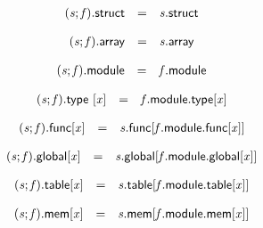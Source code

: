 $$
\begin{array}{@{}lcl@{}l@{}}
({\mathit{s}} ; {\mathit{f}}).\mathsf{struct} &=& {\mathit{s}}.\mathsf{struct} &  \\
\end{array}
$$

$$
\begin{array}{@{}lcl@{}l@{}}
({\mathit{s}} ; {\mathit{f}}).\mathsf{array} &=& {\mathit{s}}.\mathsf{array} &  \\
\end{array}
$$

$$
\begin{array}{@{}lcl@{}l@{}}
({\mathit{s}} ; {\mathit{f}}).\mathsf{module} &=& {\mathit{f}}.\mathsf{module} &  \\
\end{array}
$$

$$
\begin{array}{@{}lcl@{}l@{}}
({\mathit{s}} ; {\mathit{f}}).\mathsf{type}~{}[{\mathit{x}}] &=& {\mathit{f}}.\mathsf{module}.\mathsf{type}{}[{\mathit{x}}] &  \\
\end{array}
$$

$$
\begin{array}{@{}lcl@{}l@{}}
{({\mathit{s}} ; {\mathit{f}}).\mathsf{func}}{{}[{\mathit{x}}]} &=& {\mathit{s}}.\mathsf{func}{}[{\mathit{f}}.\mathsf{module}.\mathsf{func}{}[{\mathit{x}}]] &  \\
\end{array}
$$

$$
\begin{array}{@{}lcl@{}l@{}}
{({\mathit{s}} ; {\mathit{f}}).\mathsf{global}}{{}[{\mathit{x}}]} &=& {\mathit{s}}.\mathsf{global}{}[{\mathit{f}}.\mathsf{module}.\mathsf{global}{}[{\mathit{x}}]] &  \\
\end{array}
$$

$$
\begin{array}{@{}lcl@{}l@{}}
{({\mathit{s}} ; {\mathit{f}}).\mathsf{table}}{{}[{\mathit{x}}]} &=& {\mathit{s}}.\mathsf{table}{}[{\mathit{f}}.\mathsf{module}.\mathsf{table}{}[{\mathit{x}}]] &  \\
\end{array}
$$

$$
\begin{array}{@{}lcl@{}l@{}}
{({\mathit{s}} ; {\mathit{f}}).\mathsf{mem}}{{}[{\mathit{x}}]} &=& {\mathit{s}}.\mathsf{mem}{}[{\mathit{f}}.\mathsf{module}.\mathsf{mem}{}[{\mathit{x}}]] &  \\
\end{array}
$$

